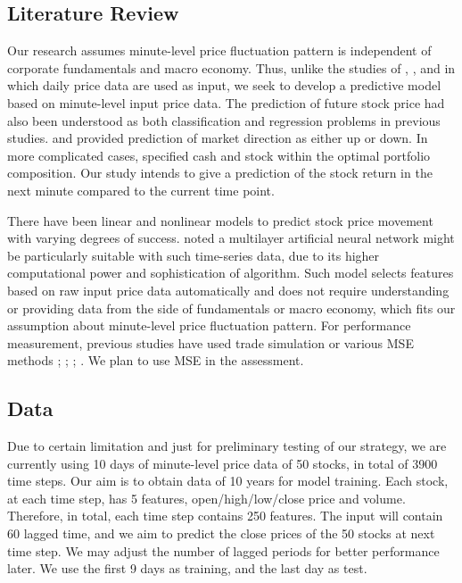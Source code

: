 \documentclass{article}
\begin{document}
\subsection{Literature Review}

Our research assumes minute-level price fluctuation pattern is independent of corporate fundamentals and macro economy. Thus, unlike the studies of \cite{Chiang2016}, \cite{Chourmouziadis2016}, and \cite{Zhong2017} in which daily price data are used as input, we seek to develop a predictive model based on minute-level input price data. The prediction of future stock price had also been understood as both classification and regression problems in previous studies. \cite{Chen2016} and \cite{Zhong2017} provided prediction of market direction as either up or down. In more complicated cases, \cite{Chourmouziadis2016} specified cash and stock within the optimal portfolio composition. Our study intends to give a prediction of the stock return in the next minute compared to the current time point.

There have been linear and nonlinear models to predict stock price movement with varying degrees of success. \cite{Chong2017} noted a multilayer artificial neural network might be particularly suitable with such time-series data, due to its higher computational power and sophistication of algorithm. Such model selects features based on raw input price data automatically and does not require understanding or providing data from the side of fundamentals or macro economy, which fits our assumption about minute-level price fluctuation pattern. For performance measurement, previous studies have used trade simulation or various MSE methods \cite{Chiang2016}; \cite{Chourmouziadis2016}; \cite{Zhong2017}; \cite{Chong2017}. We plan to use MSE in the assessment.

\subsection{Data}

Due to certain limitation and just for preliminary testing of our strategy, we are currently using 10 days of minute-level price data of 50 stocks, in total of 3900 time steps. Our aim is to obtain data of 10 years for model training. Each stock, at each time step, has 5 features, open/high/low/close price and volume. Therefore, in total, each time step contains 250 features. The input will contain 60 lagged time, and we aim to predict the close prices of the 50 stocks at next time step. We may adjust the number of lagged periods for better performance later. We use the first 9 days as training, and the last day as test.
\end{document}
